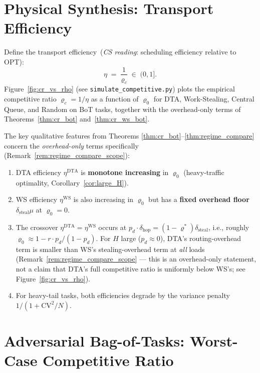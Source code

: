 \documentclass[11pt,a4paper]{report}
\newcommand{\physics}[2]{#1\ \textnormal{(\emph{CS reading}: #2)}}
\begin{document}
\section{Physical Synthesis: Transport Efficiency}

Define the \physics{transport efficiency}{scheduling efficiency relative to OPT}:
\[
  \eta \;=\; \frac{1}{\varrho_c} \;\in\; (0, 1].
\]
Figure~\ref{fig:cr_vs_rho} (see \texttt{simulate\_competitive.py}) plots the
empirical competitive ratio $\varrho_c = 1/\eta$ as a function of $\varrho_0$
for DTA, Work-Stealing, Central Queue, and Random on BoT tasks, together with
the overhead-only terms of Theorems~\ref{thm:cr_bot} and~\ref{thm:cr_ws_bot}.

The key qualitative features from Theorems \ref{thm:cr_bot}--\ref{thm:regime_compare}
concern the \emph{overhead-only} terms specifically (Remark~\ref{rem:regime_compare_scope}):
\begin{enumerate}
  \item DTA efficiency $\eta^{\mathrm{DTA}}$ is \textbf{monotone increasing} in $\varrho_0$
        (heavy-traffic optimality, Corollary~\ref{cor:large_H}).
  \item WS efficiency $\eta^{\mathrm{WS}}$ is also increasing in $\varrho_0$
        but has a \textbf{fixed overhead floor} $\delta_{\mathrm{steal}}\mu$ at $\varrho_0 = 0$.
  \item The crossover $\eta^{\mathrm{DTA}} = \eta^{\mathrm{WS}}$ occurs at
        $p_d \cdot \delta_{\mathrm{hop}} = (1-\varrho^*)\delta_{\mathrm{steal}}$,
        i.e., roughly $\varrho_0 \approx 1 - r\cdot p_d/(1-p_d)$.
        For $H$ large ($p_d \approx 0$), DTA's routing-overhead term is smaller
        than WS's stealing-overhead term at \emph{all} loads (Remark~\ref{rem:regime_compare_scope}
        --- this is an overhead-only statement, not a claim that DTA's full
        competitive ratio is uniformly below WS's; see Figure~\ref{fig:cr_vs_rho}).
  \item For heavy-tail tasks, both efficiencies degrade by the variance penalty $1/(1+\mathrm{CV}^2/N)$.
\end{enumerate}


\section{Adversarial Bag-of-Tasks: Worst-Case Competitive Ratio}
\label{sec:cr_bot_worst}
\end{document}

